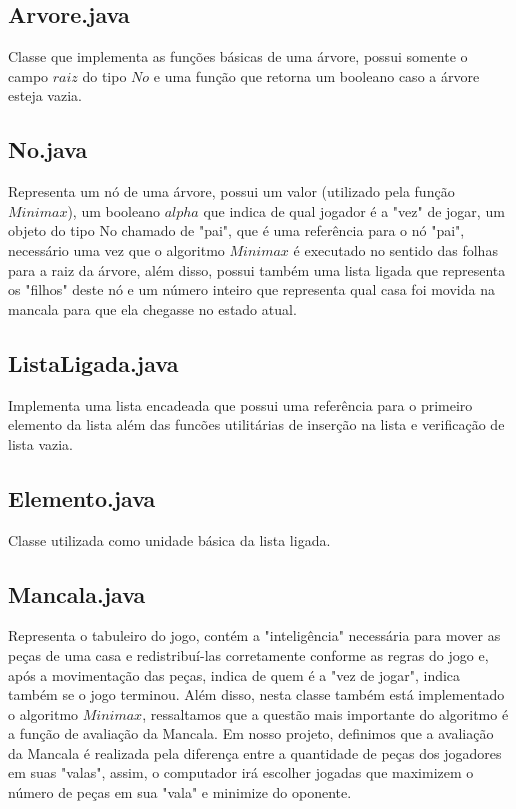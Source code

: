 \documentclass[a4paper,11pt]{article}
\begin{document}
\subsection{Arvore.java}
Classe que implementa as funções básicas de uma árvore, possui somente o campo $raiz$ do tipo $No$ e uma função que retorna um booleano caso a árvore esteja vazia.

\subsection{No.java}
Representa um nó de uma árvore, possui um valor (utilizado pela função $Minimax$), um booleano $alpha$ que indica de qual jogador é a "vez" de jogar, um objeto do tipo No chamado de "pai", que é uma referência para o nó "pai", necessário uma vez que o algoritmo $Minimax$ é executado no sentido das folhas para a raiz da árvore, além disso, possui também uma lista ligada que representa os "filhos" deste nó e um número inteiro que representa qual casa foi movida na mancala para que ela chegasse no estado atual.

\subsection{ListaLigada.java}
Implementa uma lista encadeada que possui uma referência para o primeiro elemento da lista além das funcões utilitárias de inserção na lista e verificação de lista vazia.

\subsection{Elemento.java}
Classe utilizada como unidade básica da lista ligada.

\subsection{Mancala.java}
Representa o tabuleiro do jogo, contém a "inteligência" necessária para mover as peças de uma casa e redistribuí-las corretamente conforme as regras do jogo e, após a movimentação das peças, indica de quem é a "vez de jogar", indica também se o jogo terminou. Além disso, nesta classe também está implementado o algoritmo $Minimax$, ressaltamos que a questão mais importante do algoritmo é a função de avaliação da Mancala. Em nosso projeto, definimos que a avaliação da Mancala é realizada pela diferença entre a quantidade de peças dos jogadores em suas "valas", assim, o computador irá escolher jogadas que maximizem o número de peças em sua "vala" e minimize do oponente.
\end{document}
